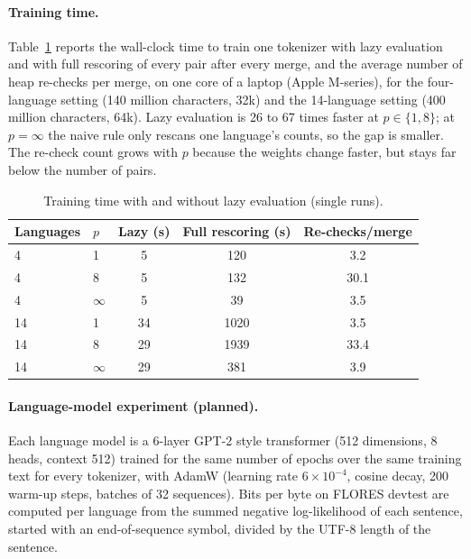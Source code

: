 \paragraph{Training time.}
Table~\ref{tab:speed} reports the wall-clock time to train one tokenizer with lazy evaluation
and with full rescoring of every pair after every merge, and the average number of heap
re-checks per merge, on one core of a laptop (Apple M-series), for the four-language setting
(140 million characters, 32k) and the 14-language setting (400 million characters, 64k).
Lazy evaluation is 26 to 67 times faster at $p\in\{1,8\}$; at $p=\infty$ the naive rule only
rescans one language's counts, so the gap is smaller. The re-check count grows with $p$
because the weights change faster, but stays far below the number of pairs.

\begin{table}[h]
\centering
\small
\begin{tabular}{llccc}
\toprule
Languages & $p$ & Lazy (s) & Full rescoring (s) & Re-checks/merge\\
\midrule
4 & 1 & 5 & 120 & 3.2\\
4 & 8 & 5 & 132 & 30.1\\
4 & $\infty$ & 5 & 39 & 3.5\\
14 & 1 & 34 & 1020 & 3.5\\
14 & 8 & 29 & 1939 & 33.4\\
14 & $\infty$ & 29 & 381 & 3.9\\
\bottomrule
\end{tabular}
\caption{Training time with and without lazy evaluation (single runs).}
\label{tab:speed}
\end{table}

\paragraph{Language-model experiment (planned).}
Each language model is a 6-layer GPT-2 style transformer (512 dimensions, 8 heads, context
512) trained for the same number of epochs over the same training text for every
tokenizer, with AdamW (learning rate $6\times10^{-4}$, cosine decay, 200 warm-up steps,
batches of 32 sequences). Bits per byte on FLORES devtest are computed per language from
the summed negative log-likelihood of each sentence, started with an end-of-sequence
symbol, divided by the UTF-8 length of the sentence.
